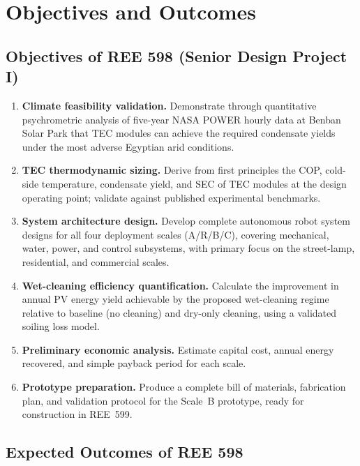 \documentclass[12pt,a4paper]{report}
\numberwithin{equation}{chapter}
\numberwithin{figure}{chapter}
\numberwithin{table}{chapter}
\begin{document}
\chapter{Objectives and Outcomes}

\section{Objectives of REE 598 (Senior Design Project I)}

\begin{enumerate}[leftmargin=*, label=\textbf{O\arabic*.}]
  \item \textbf{Climate feasibility validation.} Demonstrate through quantitative
        psychrometric analysis of five-year NASA POWER hourly data at Benban Solar Park
        that TEC modules can achieve the required condensate yields under the most adverse
        Egyptian arid conditions.
  \item \textbf{TEC thermodynamic sizing.} Derive from first principles the COP, cold-side
        temperature, condensate yield, and SEC of TEC modules at the design operating
        point; validate against published experimental benchmarks.
  \item \textbf{System architecture design.} Develop complete autonomous robot system
        designs for all four deployment scales (A/R/B/C), covering mechanical, water,
        power, and control subsystems, with primary focus on the street-lamp,
        residential, and commercial scales.
  \item \textbf{Wet-cleaning efficiency quantification.} Calculate the improvement in
        annual PV energy yield achievable by the proposed wet-cleaning regime relative to
        baseline (no cleaning) and dry-only cleaning, using a validated soiling loss model.
  \item \textbf{Preliminary economic analysis.} Estimate capital cost, annual energy
        recovered, and simple payback period for each scale.
  \item \textbf{Prototype preparation.} Produce a complete bill of materials, fabrication
        plan, and validation protocol for the Scale~B prototype, ready for construction
        in REE~599.
\end{enumerate}

\section{Expected Outcomes of REE 598}
\end{document}
